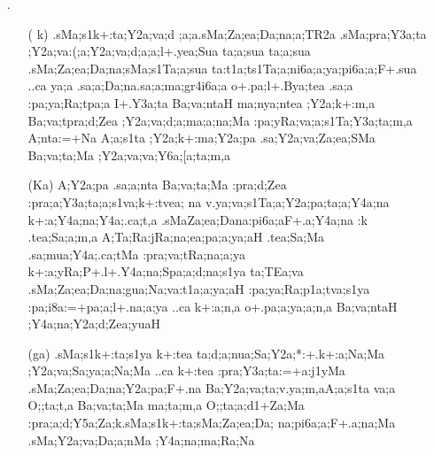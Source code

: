 \begin{itemize}

\item[{\sktf 23}.] \begin{itemize}
           
           \item[( {\sktf k})] {\sktf .sMa;s1k+:ta;Y2a;va;d%
;a;a\ZF{-}.sMa;Za;ea;Da;na;a;TR2a .sMa;pra;Y3a;ta \ZF{)} ;Y2a;va:(;a;Y2a;va;d;a;a;l+.yea;Sua\ZF{,}
\ZF{(}{\sktf 2\ZF{)}} {ta;a};sua {ta;a};sua .sMa;Za;ea;Da;na;sMa;s1Ta;a;sua\ZF{,} \ZF{)} ta:t1a;ts1Ta;a;ni6a;a;ya;pi6a;a;F+.sua ..ca ya;a
.sa;a;Da;na\ZF{-}.sa;a;ma;gr4i6a;a o+.pa;l+.Bya;tea\ZF{,} .sa;a :pa;ya;Ra;tpa;a I+.Y3a;ta Ba;va;ntaH ma;nya;ntea ;Y2a;k+:m,a
Ba;va;tpra;d;Zea ;Y2a;va;d;a;ma;a;na;Ma
:pa;yRa;va;a;s1Ta;Y3a;ta;m,a A;nta:=+Na
A;a;s1ta ;Y2a;k+:ma;Y2a;pa .sa;Y2a;va;Za;ea;SMa Ba;va;ta;Ma
;Y2a;va;va;Y6a;[a;ta;m,a} 

           \item[({\sktf Ka})] {\sktf A;Y2a;pa .sa;a;nta
Ba;va;ta;Ma :pra;d;Zea :pra;a;Y3a;ta;a;s1va;k+:tvea;%
na v.ya;va;s1Ta;a;Y2a;pa;ta;a;Y4a;na k+:a;Y4a;na;Y4a;.ca;t,a
{.sMa}{Za;ea}{;Da}{na}{:pi6a;a}{F+.a};Y4a;na :k .tea;Sa;a;m,a
A;Ta;Ra:jRa;na;ea;pa;a;ya;aH .tea;Sa;Ma .sa;mua;Y4a;.ca;tMa
:pra;va;tRa;na;a;ya\ZF{,} k+:a;yRa;P+.l+.Y4a;na;Spa;a;d;na;s1ya ta;TEa{;va}
.sMa;Za;ea;Da;na;gua;Na;va:t1a;a;ya;aH :pa;ya;Ra;p1a;tva;s1ya
:pa;i8a:=+pa;a;l+.na;a;ya ..ca\ZF{,} k+:a;n,a o+.pa;a;ya;a;n,a
Ba;va;ntaH ;Y4a;na;Y2a;d;Zea;yuaH}
           
           \item[({\sktf ga})] {\sktf .sMa;s1k+:ta;s1ya
k+:tea ta;d;a;nua;Sa;Y2a;*:+.k+:a;Na;Ma
;Y2a;va;Sa;ya;a;Na;Ma ..ca k+:tea :pra;Y3a;ta:=+a:j1yMa
.sMa;Za;ea;Da;na;Y2a;pa;F+.na Ba;Y2a;va;ta;v.ya;m,a\ZF{---}A;a;s1ta
va;a O;;ta;t,a Ba;va;ta;Ma ma;ta;m,a O;;ta;a;d1+Za;Ma
:pra;a;d;Y5a;Za;k\ZF{-}.sMa;s1k+:ta;sMa;Za;ea;Da;%
na;pi6a;a;F+.a;na;Ma .sMa;Y2a;va;Da;a;nMa \ZF{(};Y4a;na;ma;Ra;Na}


\end{itemize}
\end{itemize}
